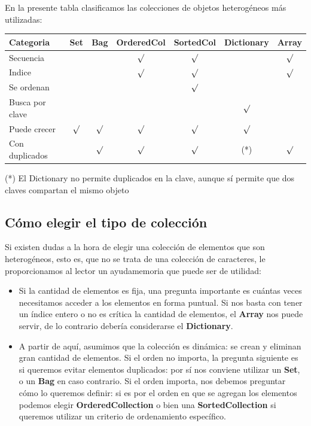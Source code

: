 \documentclass[a4paper,12pt]{book}
\begin{document}
En la presente tabla clasificamos las colecciones de objetos heterogéneos más utilizadas:
\newline

\begin{tabular}{|l|c|c|c|c|c|c|}
\hline
\cellcolor[gray]{0.8}
Categoria & \cellcolor[gray]{0.8} Set & \cellcolor[gray]{0.8} Bag & \cellcolor[gray]{0.8} OrderedCol
& \cellcolor[gray]{0.8} SortedCol & \cellcolor[gray]{0.8} Dictionary
& \cellcolor[gray]{0.8} Array \\
\hline
Secuencia & & & $\surd$ & $\surd$ & & $\surd$ \\
\hline
Indice & & & $\surd$ & $\surd$ & & $\surd$ \\
\hline
Se ordenan & & & & $\surd$ & & \\
\hline
Busca por clave & & & & & $\surd$ & \\
\hline
Puede crecer & $\surd$ & $\surd$ & $\surd$ & $\surd$ & $\surd$ & \\
\hline
Con duplicados & & $\surd$ & $\surd$ & $\surd$ & (*) & $\surd$ \\
\hline
\end{tabular}
\newline\newline

(*) El Dictionary no permite duplicados en la clave, aunque sí permite que dos claves compartan el mismo objeto

\subsection{Cómo elegir el tipo de colección}

Si existen dudas a la hora de elegir una colección de elementos que son heterogéneos, esto es, que no se trata
de una colección de caracteres, le proporcionamos al lector un ayudamemoria que puede ser de utilidad:

\begin{itemize}
 \item Si la cantidad de elementos es fija, una pregunta importante es cuántas veces necesitamos acceder
 a los elementos en forma puntual. Si nos basta con tener un índice entero o no es crítica la cantidad
 de elementos, el \textbf{Array} nos puede servir, de lo contrario debería considerarse el \textbf{Dictionary}.
 \item A partir de aquí, asumimos que la colección es dinámica: se crean y eliminan gran cantidad de elementos.
 Si el orden no importa, la pregunta siguiente es si queremos evitar elementos duplicados: por sí nos conviene
 utilizar un \textbf{Set}, o un \textbf{Bag} en caso contrario. Si el orden importa, nos debemos preguntar cómo
 lo queremos definir: si es por el orden en que se agregan los elementos podemos elegir \textbf{OrderedCollection}
 o bien una \textbf{SortedCollection} si queremos utilizar un criterio de ordenamiento específico. 
\end{itemize}
\end{document}
